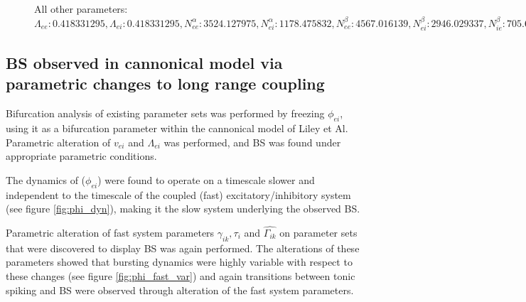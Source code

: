 \documentclass[a4paper,12pt]{article}
\begin{document}
\begin{figure}
{	All other parameters:
$\Lambda_{ee}: 0.418331295, \Lambda_{ei}: 0.418331295, N^{\alpha}_{ee}: 3524.127975, N^{\alpha}_{ei}: 1178.475832,
N^{\beta}_{ee}: 4567.016139, N^{\beta}_{ei}: 2946.029337, N^{\beta}_{ie}: 705.6645138, N^{\beta}_{ii}: 155.6924316,
\Gamma_{ee}: 1.030206899, \hat{\Gamma_{ei}}: 1.245480131, \hat{\Gamma_{ie}}: 1.661138507, \Gamma_{ii}: 1.144879622,
g: 0.7, \gamma_{ee}: 0.71336694981, \gamma_{ei}: 0.53411167, \chi_{ee}: 700.0, \chi_{ei}: 700.0, h^{rest}_e: -79.27217543,
h^{eq}_{ee}: -19.32193417, h^{eq}_{ei}: -8.307573166, h^{rest}_i: -76.08372036, h^{eq}_{ie}: -85.45750982,
h^{eq}_{ii}: -84.48223465, \mu_e: -54.37736285, \mu_i: -54.60726943,
p_{ee}: 6.8330303706, p_{ei}: 9.2679440497,
p_{ie}: 0.0, p_{ii}: 0.0, \phi_{ie}: 0, \phi_{ii}: 0, S^{max}_e: 0.0637001, S^{max}_i: 0.0838227,
\sigma_e: 4.16943943, \sigma_i: 2.126102814, \tau_e: 73.3, \tau_i: 75.2, \tau^{slow}: 3665.0,
  v: 0.839055$
}
\end{figure}


\subsection{BS observed in cannonical model via parametric changes to long range coupling}

Bifurcation analysis of existing parameter sets was performed by freezing $\phi_{ei}$, using it as a bifurcation parameter within the cannonical model of Liley et Al. Parametric alteration of $v_{ei}$ and $\Lambda_{ei}$ was performed, and BS was found under appropriate parametric conditions. 

The dynamics of ($\phi_{ei}$) were found to operate on a timescale slower and independent to the timescale of the coupled (fast)
excitatory/inhibitory system (see figure \ref{fig:phi_dyn}), making it the slow system underlying the observed BS.

Parametric alteration of fast system parameters $\gamma_{ik}, \tau_i$ and $\hat{\Gamma_{ik}}$ on parameter sets that were discovered to display BS was again performed. The alterations of these parameters showed that bursting dynamics were highly variable with respect to these changes (see figure \ref{fig:phi_fast_var}) and again transitions between tonic spiking and BS were observed through alteration of the fast system parameters.
\end{document}
